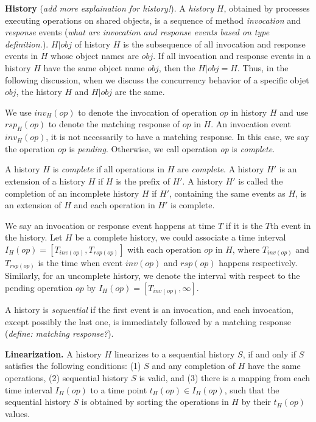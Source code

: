 \textbf{History}
(\emph{add more explaination for history!}).
A \emph{history} $H$, obtained by processes executing
operations on shared objects, is a sequence of method \emph{invocation} and \emph{response} events
(\emph{what are invocation and response events based on type definition.}). $H|obj$ of history $H$ is the subsequence of all
invocation and response events in $H$ whose object names are $obj$. If all invocation and response
events in a history $H$ have the same object name $obj$, then the $H|obj = H$. Thus, in the following discussion,
when we discuss the concurrency behavior of a specific objet $obj$, the history $H$ and $H|obj$ are the same.

We use $inv_H(op)$ to denote the invocation of operation $op$ in history $H$ and use $rsp_H(op)$ to
denote the matching response of $op$ in $H$. An invocation event $inv_H(op)$, it is not necessarily to have a
matching response. In this case, we say the operation $op$ is \emph{pending}. Otherwise, we call operation \emph{op}
is \emph{complete}.

A history $H$ is \emph{complete} if all operations in $H$ are \emph{complete}. A history $H'$ is an extension of a history $H$
if $H$ is the prefix of $H'$. A history $H'$ is called the completion of an incomplete history $H$ if $H'$, containing the same
events as $H$, is an extension of $H$ and each operation in $H'$ is complete.

We say an invocation or response event happens at time $T$ if it is the $T$th event in the history. 
Let $H$ be a complete history, we could associate a time interval $I_H(op) = [T_{inv(op)}, T_{rsp(op)}]$ with each
operation $op$ in $H$, where $T_{inv(op)}$ and $T_{rsp(op)}$ is the time when event $inv(op)$ and $rsp(op)$ happens 
respectively. Similarly, for an uncomplete history, we denote the interval with respect to the pending
operation $op$ by $I_H(op) = [T_{inv(op)}, \infty]$.

A history is \emph{sequential} if the first event is an invocation, and each invocation, except possibly the last
one, is immediately followed by a matching response (\emph{define: matching response?}).



\textbf{Linearization.}
A history $H$ linearizes to a sequential history $S$, if and only if $S$ satisfies the
following conditions: (1) $S$ and any completion of $H$ have the same operations, (2) sequential history $S$ is
valid, and (3) there is a mapping from each time interval $I_H(op)$ to a time point $t_H(op) \in I_H(op)$, such
that the sequential history $S$ is obtained by sorting the operations in $H$ by their $t_H(op)$ values.

